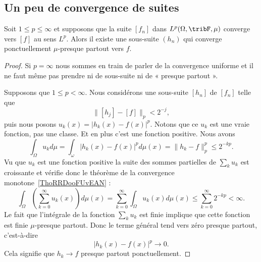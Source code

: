 \subsection{Un peu de convergence de suites}

\begin{proposition}  \label{PropWoywYG}
	Soit \( 1\leq p\leq \infty\) et supposons que la suite \( [f_n]\) dans \( L^p(\Omega,\tribF,\mu)\) converge vers \( [f]\) au sens \( L^p\). Alors il existe une sous-suite \( (h_n)\) qui converge ponctuellement \( \mu\)-presque partout vers \( f\).
\end{proposition}

\begin{proof}
	Si \( p=\infty\) nous sommes en train de parler de la convergence uniforme et il ne faut même pas prendre ni de sous-suite ni de « presque partout ».

	Supposons que \( 1\leq p<\infty\). Nous considérons une sous-suite \( [h_n]\) de \( [f_n]\) telle que
	\begin{equation}
		\| [h_j]-[f] \|_p<2^{-j},
	\end{equation}
	puis nous posons \( u_k(x)=| h_k(x)-f(x) |^p\). Notons que ce \( u_k\) est une vraie fonction, pas une classe. Et en plus c'est une fonction positive. Nous avons
	\begin{equation}
		\int_{\Omega}u_kd\mu=\int_{\omega}| h_k(x)-f(x) |^pd\mu(x)=\| h_k-f \|_p^p\leq 2^{-kp}.
	\end{equation}
	Vu que \( u_k\) est une fonction positive la suite des sommes partielles de \( \sum_ku_k\) est croissante et vérifie donc le théorème de la convergence monotone~\ref{ThoRRDooFUvEAN} :
	\begin{equation}
		\int_{\Omega}\left( \sum_{k=0}^{\infty}u_k(x) \right)d\mu(x)=\sum_{k=0}^{\infty}\int_{\Omega}u_k(x)d\mu(x)
		\leq\sum_{k=0}^{\infty}2^{-kp}<\infty.
	\end{equation}
	Le fait que l'intégrale de la fonction \( \sum_ku_k\) est finie implique que cette fonction est finie \( \mu\)-presque partout. Donc le terme général tend vers zéro presque partout, c'est-à-dire
	\begin{equation}
		| h_k(x)-f(x) |^p\to 0.
	\end{equation}
	Cela signifie que \( h_k\to f\) presque partout ponctuellement.
\end{proof}

